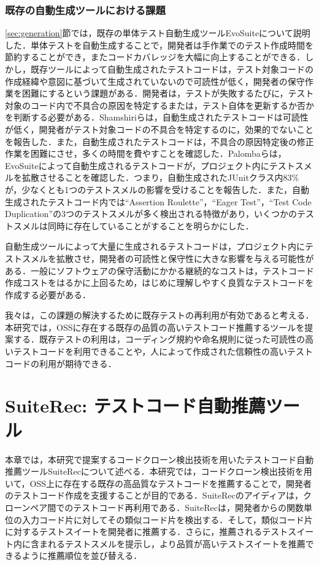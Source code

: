 \documentclass[12pt]{jarticle} %
\begin{document}
\subsubsection{既存の自動生成ツールにおける課題}

\ref{sec:generation}節では，既存の単体テスト自動生成ツール{\sf EvoSuite}について説明した．単体テストを自動生成することで，開発者は手作業でのテスト作成時間を節約することができ，またコードカバレッジを大幅に向上することができる．しかし，既存ツールによって自動生成されたテストコードは，テスト対象コードの作成経緯や意図に基づいて生成されていないので可読性が低く，開発者の保守作業を困難にするという課題がある\cite{b14,b15,b13}．開発者は，テストが失敗するたびに，テスト対象のコード内で不具合の原因を特定するまたは，テスト自体を更新するか否かを判断する必要がある．Shamshiriら\cite{b1}は，自動生成されたテストコードは可読性が低く，開発者がテスト対象コードの不具合を特定するのに，効果的でないことを報告した．また，自動生成されたテストコードは，不具合の原因特定後の修正作業を困難にさせ，多くの時間を費やすことを確認した．Palombaら\cite{Fabio2016}は，{\sf EvoSuite}によって自動生成されるテストコードが，プロジェクト内にテストスメルを拡散させることを確認した．つまり，自動生成されたJUnitクラス内83\%が，少なくとも1つのテストスメルの影響を受けることを報告した．また，自動生成されたテストコード内では``Assertion Roulette''，``Eager Test''，``Test Code Duplication''の3つのテストスメルが多く検出される特徴があり，いくつかのテストスメルは同時に存在していることがすることを明らかにした．

自動生成ツールによって大量に生成されるテストコードは，プロジェクト内にテストスメルを拡散させ，開発者の可読性と保守性に大きな影響を与える可能性がある．一般にソフトウェアの保守活動にかかる継続的なコストは，テストコード作成コストをはるかに上回るため，はじめに理解しやすく良質なテストコードを作成する必要がある．

我々は，この課題の解決するために既存テストの再利用が有効であると考える．本研究では，OSSに存在する既存の品質の高いテストコード推薦するツールを提案する．既存テストの利用は，コーディング規約や命名規則に従った可読性の高いテストコードを利用できることや，人によって作成された信頼性の高いテストコードの利用が期待できる．


\newpage
\section{SuiteRec: テストコード自動推薦ツール}

本章では，本研究で提案するコードクローン検出技術を用いたテストコード自動推薦ツール{\sf SuiteRec}について述べる．本研究では，コードクローン検出技術を用いて，OSS上に存在する既存の高品質なテストコードを推薦することで，開発者のテストコード作成を支援することが目的である．{\sf SuiteRec}のアイディアは，クローンペア間でのテストコード再利用である．{\sf SuiteRec}は，開発者からの関数単位の入力コード片に対してその類似コード片を検出する．そして，類似コード片に対するテストスイートを開発者に推薦する．さらに，推薦されるテストスイート内に含まれるテストスメルを提示し，より品質が高いテストスイートを推薦できるように推薦順位を並び替える．
\end{document}
